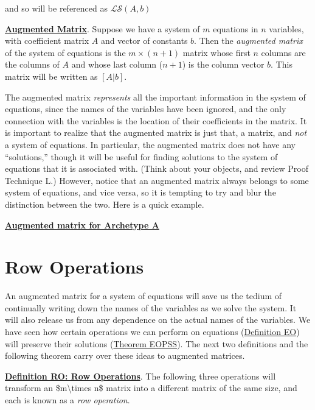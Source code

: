 \documentclass[openany]{book}
\begin{document}
and so will be referenced as \(\mathcal L \mathcal S({A}, b)\)

\protect\hyperlink{definition-am-augmented-matrix}{\textbf{Augmented
Matrix}}. Suppose we have a system of \(m\) equations in \(n\)
variables, with coefficient matrix \(A\) and vector of constants
\({b}\). Then the \emph{augmented matrix} of the system of equations is
the \(m\times(n+1)\) matrix whose first \(n\) columns are the columns of
\(A\) and whose last column (\(n+1\)) is the column vector \({b}\). This
matrix will be written as \([A|b]\).

The augmented matrix \emph{represents} all the important information in
the system of equations, since the names of the variables have been
ignored, and the only connection with the variables is the location of
their coefficients in the matrix. It is important to realize that the
augmented matrix is just that, a matrix, and \emph{not} a system of
equations. In particular, the augmented matrix does not have any
``solutions,'' though it will be useful for finding solutions to the
system of equations that it is associated with. (Think about your
objects, and review {Proof Technique L}.) However, notice that an
augmented matrix always belongs to some system of equations, and vice
versa, so it is tempting to try and blur the distinction between the
two. Here is a quick example.

\protect\hyperlink{example-amaa-augmented-matrix-for-archetype-a}{\textbf{Augmented
matrix for Archetype A}}

\section{Row Operations}\label{row-operations}

An augmented matrix for a system of equations will save us the tedium of
continually writing down the names of the variables as we solve the
system. It will also release us from any dependence on the actual names
of the variables. We have seen how certain operations we can perform on
equations
(\href{http://linear.ups.edu/html/section-RREF.html}{Definition EO})
will preserve their solutions
(\href{http://linear.ups.edu/html/section-RREF.html}{Theorem EOPSS}).
The next two definitions and the following theorem carry over these
ideas to augmented matrices.

\protect\hyperlink{definition-ro-row-operations}{\textbf{Definition RO:
Row Operations}}. The following three operations will transform an
\$m\textbackslash{}times n\$ matrix into a different matrix of the same
size, and each is known as a \emph{row operation}.
\end{document}
